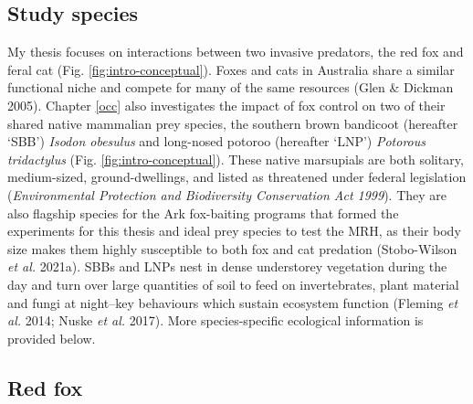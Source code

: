 \documentclass[11pt,a4paper,titlepage,twoside,openright]{style/unimelbthesis}
\begin{document}
\begin{mainmatter}
\hypertarget{study-species}{%
\section{Study species}\label{study-species}}

My thesis focuses on interactions between two invasive predators, the red fox and feral cat (Fig. \ref{fig:intro-conceptual}). Foxes and cats in Australia share a similar functional niche and compete for many of the same resources (Glen \& Dickman 2005). Chapter \ref{occ} also investigates the impact of fox control on two of their shared native mammalian prey species, the southern brown bandicoot (hereafter `SBB') \emph{Isodon obesulus} and long-nosed potoroo (hereafter `LNP') \emph{Potorous tridactylus} (Fig. \ref{fig:intro-conceptual}). These native marsupials are both solitary, medium-sized, ground-dwellings, and listed as threatened under federal legislation (\emph{Environmental Protection and Biodiversity Conservation Act 1999}). They are also flagship species for the Ark fox-baiting programs that formed the experiments for this thesis and ideal prey species to test the MRH, as their body size makes them highly susceptible to both fox and cat predation (Stobo-Wilson \emph{et al.} 2021a). SBBs and LNPs nest in dense understorey vegetation during the day and turn over large quantities of soil to feed on invertebrates, plant material and fungi at night--key behaviours which sustain ecosystem function (Fleming \emph{et al.} 2014; Nuske \emph{et al.} 2017). More species-specific ecological information is provided below.

\hypertarget{red-fox}{%
\subsection{Red fox}\label{red-fox}}


\end{mainmatter}
\end{document}

